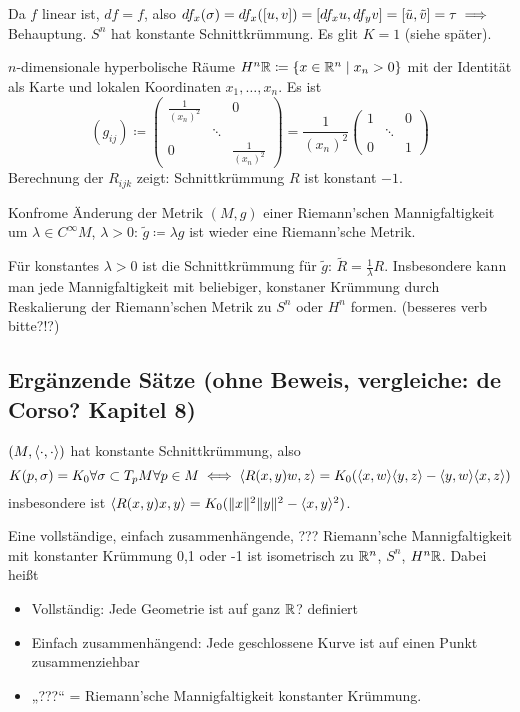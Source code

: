\documentclass[a4paper,twoside,DIV15,BCOR12mm]{scrbook}
\renewcommand{\da}{\coloneqq}
\begin{document}
\begin{bemerkungen}
\begin{beweis}
Da $f$ linear ist, $df=f$, also $df_x(\sigma) = df_x([u,v]) = [df_xu, df_yv] = [\tilde u, \tilde v] = \tau \implies$ Behauptung. $S^n$ hat konstante Schnittkrümmung. Es glit $K=1$ (siehe später).
\end{beweis}

\item $n$-dimensionale hyperbolische Räume $H^n\MdR \da \{ x\in\MdR^n \mid x_n > 0\}$ mit der Identität als Karte und lokalen Koordinaten $x_1,\ldots,x_n$. Es ist
\[
(g_{ij}) \da 
\begin{pmatrix}
\frac{1}{(x_n)^2} & & 0 \\
& \ddots & \\
0 & & \frac 1 {(x_n)^2}
\end{pmatrix} = \frac 1 {(x_n)^2} 
\begin{pmatrix}
1 & & 0 \\
& \ddots & \\
0 & & 1
\end{pmatrix}
\] Berechnung der $R_{ijk}$ zeigt: Schnittkrümmung $R$ ist konstant $-1$.

\item Konfrome Änderung der Metrik $(M,g)$ einer Riemann’schen Mannigfaltigkeit um $\lambda \in C^\infty M$, $\lambda >0$: $\tilde g \da \lambda g$ ist wieder eine Riemann’sche Metrik.

Für konstantes $\lambda>0$ ist die Schnittkrümmung für $\tilde g$: $\tilde R=\frac 1\lambda R$. Insbesondere kann man jede Mannigfaltigkeit mit beliebiger, konstaner Krümmung durch Reskalierung der Riemann’schen Metrik zu $S^n$ oder $H^n$ formen. (besseres verb bitte?!?)

\end{bemerkungen}

\subsection*{Ergänzende Sätze (ohne Beweis, vergleiche: de Corso? Kapitel 8)}

\begin{satz*}
$(M, \langle\cdot,\cdot\rangle)$ hat konstante Schnittkrümmung, also
\[ K(p,\sigma) = K_0 \forall \sigma \subset T_pM
\forall p \in M \iff \langle R(x,y)w,z\rangle = K_0 (\langle x,w\rangle \langle y,z\rangle - \langle y,w\rangle \langle x,z\rangle)
\]
insbesondere ist $\langle R(x,y)x,y\rangle = K_0(\|x\|^2\|y\|^2 - \langle x,y\rangle ^2)$.
\end{satz*}

\begin{satz*}[Hopf]
Eine vollständige, einfach zusammenhängende, ??? Riemann’sche Mannigfaltigkeit mit konstanter Krümmung 0,1 oder -1 ist isometrisch zu $\mathbb{R}^n$, $S^n$, $H^n\mathbb{R}$. Dabei heißt
\begin{itemize}
\item Vollständig: Jede Geometrie ist auf ganz $\mathbb{R}$? definiert
\item Einfach zusammenhängend: Jede geschlossene Kurve ist auf einen Punkt zusammenziehbar
\item „???“ = Riemann’sche Mannigfaltigkeit konstanter Krümmung.
\end{itemize}

\end{satz*}
\end{document}
